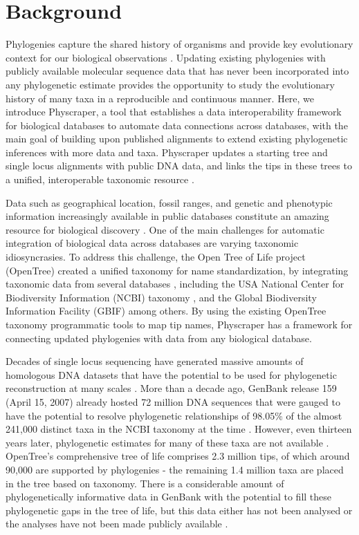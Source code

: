 \documentclass{bmcart}
\begin{document}

\section*{Background}
Phylogenies capture the shared history of organisms and provide key evolutionary
context for our biological observations \cite{dobzhansky1973nothing}.
Updating existing phylogenies with publicly available molecular sequence data that
has never been
incorporated into any phylogenetic estimate provides the opportunity to study
the evolutionary history of many taxa in a reproducible and continuous manner.
Here, we introduce Physcraper, a tool that establishes a data interoperability
framework for biological databases to automate data connections across databases,
with the main goal of building upon published alignments to extend existing
phylogenetic inferences with more data and taxa.
Physcraper updates a starting tree and single locus alignments
with public DNA data, and links the tips in these trees to a unified, interoperable
taxonomic resource \cite{rees2017automated}.

Data such as
geographical location, fossil ranges, and genetic and phenotypic information increasingly
available in public databases constitute an amazing
resource for biological discovery \cite{baxevanis2015importance}.
One of the main challenges for automatic
integration of biological data across databases are varying taxonomic idiosyncrasies.
To address this challenge, the Open Tree of Life project (OpenTree)
created a unified taxonomy for name standardization, by integrating taxonomic
data from several databases \cite{rees2017automated}, including the USA National
Center for Biodiversity Information (NCBI) taxonomy \cite{federhen_ncbi_2012, schoch_ncbi_2020},
and the Global Biodiversity Information Facility (GBIF) \cite{gbif_secretariat_gbif_2019} among others.
By using the existing OpenTree taxonomy programmatic tools to map tip names,
Physcraper has a framework for connecting updated phylogenies with data from any
biological database.

Decades of single locus sequencing have generated
massive amounts of homologous DNA datasets that have the potential to be used for phylogenetic
reconstruction at many scales \cite{sanderson2008phylota}.
More than a decade ago, GenBank release 159 (April 15, 2007) already hosted 72
million DNA sequences that were gauged to have the potential to resolve phylogenetic
relationships of 98.05\% of the almost 241,000
distinct taxa in the NCBI taxonomy at the time \cite{sanderson2008phylota}.
However, even thirteen years later, phylogenetic estimates for many of these taxa are not available \cite{mctavish_how_2017}.
OpenTree's comprehensive tree of life comprises 2.3 million tips, of which around
90,000 are supported by phylogenies - the remaining 1.4 million taxa are placed
in the tree based on taxonomy.
There is a considerable amount of phylogenetically
informative data in GenBank with the potential to fill these phylogenetic gaps in
the tree of life, but this data either has not been analysed or the analyses
have not been made publicly available \cite{mctavish_how_2017}.
\end{document}
